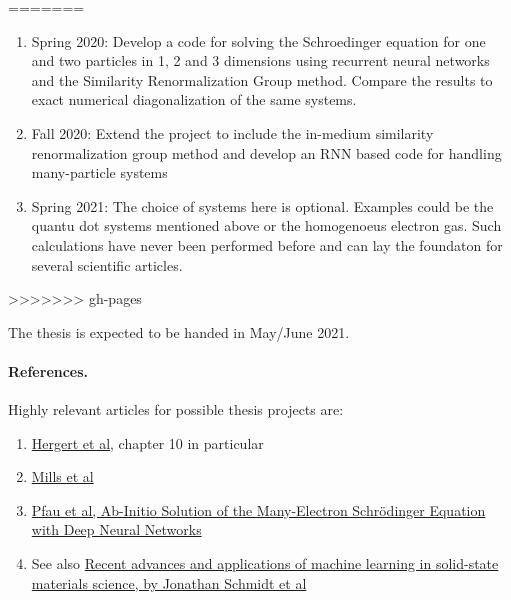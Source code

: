 \documentclass[%
oneside,                 %
final,                   %
10pt]{article}
\begin{document}
\noindent
=======
\begin{enumerate}
\item Spring 2020: Develop a code for solving the Schroedinger equation for one and two particles in 1, 2 and 3 dimensions using recurrent neural networks and the Similarity Renormalization Group method. Compare the results to exact numerical diagonalization of the same systems.

\item Fall 2020: Extend the project to include the in-medium similarity renormalization group method and develop an RNN based code for handling many-particle systems

\item Spring 2021: The choice of systems here is optional. Examples could be the quantu dot systems mentioned above or the homogenoeus electron gas. Such calculations have never been performed before and can lay the foundaton for several scientific articles.
\end{enumerate}

\noindent
>>>>>>> gh-pages

The thesis is expected to be handed in May/June  2021.

\paragraph{References.}
Highly relevant articles for possible thesis projects are:

\begin{enumerate}
\item \href{{https://www.springer.com/gp/book/9783319533353}}{Hergert et al}, chapter 10 in particular

\item \href{{https://journals.aps.org/pra/abstract/10.1103/PhysRevA.96.042113}}{Mills et al} 

\item \href{{https://arxiv.org/abs/1909.02487}}{Pfau et al, Ab-Initio Solution of the Many-Electron Schrödinger Equation with Deep Neural Networks}

\item See also \href{{https://www.nature.com/articles/s41524-019-0221-0}}{Recent advances and applications of machine learning in solid-state materials science, by  Jonathan Schmidt et al}
\end{enumerate}

\noindent

\end{document}

